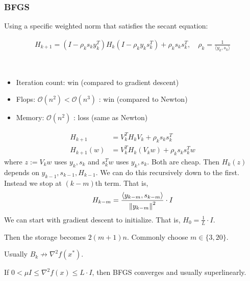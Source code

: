 \documentclass[class=article,crop=false]{standalone}
\begin{document}
\subsubsection{BFGS}
Using a specific weighted norm that satisfies the secant equation:
\begin{thm}[BFGS]
\begin{align*}
	H_{k+1} = \left( I- \rho_k s_k y_k^{T}  \right) H_k(I- \rho_k y_k s_k^{T}) + \rho_k s_k s_k^{T}, \quad \rho_k = \frac{1}{\langle y_k,s_k \rangle}
\end{align*}
\end{thm}

\begin{remark}
	~\begin{itemize}
		\item Iteration count: win (compared to gradient descent)
		\item Flops: $ \mathcal{ O}(n^2) < \mathcal{ O} (n^3)$ : win (compared to Newton)
		\item Memory: $ \mathcal{ O}(n^2)$ : loss (same as Newton)
	\end{itemize}
\end{remark}

\begin{thm}[L-BFGS]
\begin{align*}
	H_{k+1} &= V_k^{T} H_k V_k + \rho_k s_k s_k^{T}\\
	H_{k+1} (w) &= V_k^{T} H_{k} (V_k w)+ \rho_k s_k s_k^{T} w
\end{align*}
where $ z :=V_k w$ uses $ y_k, s_k$ and $ s_k^{T} w$ uses $ y_k, s_k$. Both are cheap. Then $ H_k (z)$ depends on $ y_{k-1}, s_{k-1}, H_{k-1}$. We can do this recursively down to the first. Instead we stop at $ (k-m)$th term. That is,
 \begin{align*}
	H_{k-m} = \frac{\langle y_{k-m},s_{k-m} \rangle}{ {\left\lVert{ y_{k-m}}\right\rVert}^2 } \cdot I
\end{align*}
We can start with gradient descent to initialize. That is, $ H_0 = \frac{1}{L} \cdot I$.
\end{thm}
Then the storage becomes $ 2(m+1) n $. Commonly choose  $ m \in \{3,20\} $.

\begin{remark}
	Usually $ B_k \not\to \nabla ^2f(x^* )$. 
\end{remark}

\begin{thm}[convergence]
	If $ 0< \mu I \leq \nabla ^2 f(x) \leq L \cdot I$, then BFGS converges and usually superlinearly.
\end{thm}
\end{document}
